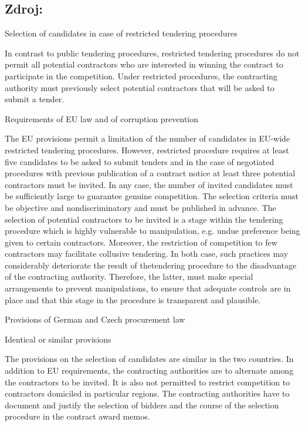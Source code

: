 \documentclass[10pt]{article}
\begin{document}
\subsection*{Zdroj:}



Selection of candidates in case of restricted tendering procedures

In contrast to public tendering procedures, restricted tendering procedures do not permit all potential contractors who are interested in winning the contract to participate in the competition.
Under restricted procedures, the contracting authority must previously select potential contractors that will be asked to submit a tender.


Requirements of EU law and of corruption prevention

The EU provisions permit a limitation of the number of candidates in EU-wide restricted tendering procedures.
However, restricted procedure requires at least five candidates to be asked to submit tenders and in the case of negotiated procedures with previous publication of a contract notice at least three potential contractors must be invited.
In any case, the number of invited candidates must be sufficiently large to guarantee genuine competition.
The selection criteria must be objective and nondiscriminatory and must be published in advance.
The selection of potential contractors to be invited is a stage within the tendering procedure which is highly vulnerable to manipulation, e.g. undue preference being given to certain contractors.
Moreover, the restriction of competition to few contractors may facilitate collusive tendering.
In both case, such practices may considerably deteriorate the result of thetendering procedure to the disadvantage of the contracting authority.
Therefore, the latter, must make special arrangements to prevent manipulations, to ensure that adequate controls are in place and that this stage in the procedure is transparent and plausible.


Provisions of German and Czech procurement law



Identical or similar provisions

The provisions on the selection of candidates are similar in the two countries.
In addition to EU requirements, the contracting authorities are to alternate among the contractors to be invited.
It is also not permitted to restrict competition to contractors domiciled in particular regions.
The contracting authorities have to document and justify the selection of bidders and the course of the selection procedure in the contract award memos.
\end{document}
